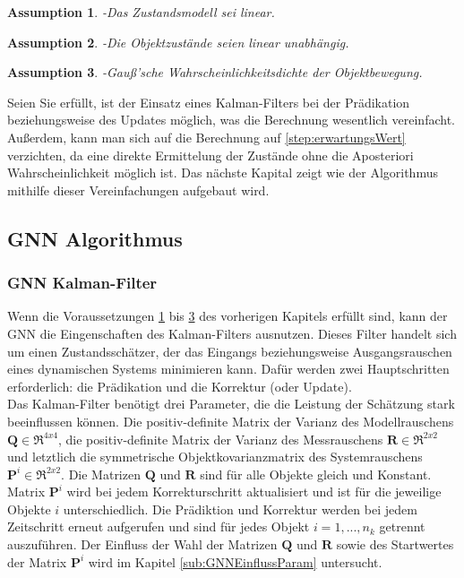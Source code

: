\documentclass[10pt,a4paper]{article}
\newtheorem{assumption}{Assumption}
\begin{document}
\begin{assumption}-\label{Ass:LinMod}
  Das Zustandsmodell sei linear.
\end{assumption}
\begin{assumption}-\label{Ass:ZustUnab}
  Die Objektzustände seien linear unabhängig.
\end{assumption}
\begin{assumption}-\label{AssGauss}
  Gauß'sche Wahrscheinlichkeitsdichte der Objektbewegung.
\end{assumption}
Seien Sie erfüllt, ist der Einsatz eines Kalman-Filters bei der Prädikation beziehungsweise des Updates möglich, was die Berechnung wesentlich vereinfacht. Außerdem, kann man sich auf die Berechnung auf \ref{step:erwartungsWert} verzichten, da eine direkte Ermittelung der Zustände ohne die Aposteriori Wahrscheinlichkeit möglich ist. Das nächste Kapital zeigt wie der Algorithmus mithilfe dieser Vereinfachungen aufgebaut wird.
\subsection{GNN Algorithmus}\label{subsec:GNNAlg}
\subsubsection{GNN Kalman-Filter}
Wenn die Voraussetzungen \ref{Ass:LinMod} bis \ref{AssGauss} des vorherigen Kapitels erfüllt sind, kann der GNN die Eingenschaften des Kalman-Filters ausnutzen. Dieses Filter handelt sich um einen Zustandsschätzer, der das Eingangs beziehungsweise Ausgangsrauschen eines dynamischen Systems minimieren kann. Dafür werden zwei Hauptschritten erforderlich: die Prädikation und die Korrektur (oder Update).\\
Das Kalman-Filter benötigt drei Parameter, die die Leistung der Schätzung stark beeinflussen können. Die positiv-definite Matrix der Varianz des Modellrauschens $\textbf{Q} \in \Re^{4x4}$, die positiv-definite Matrix der Varianz des Messrauschens $\textbf{R} \in \Re^{2x2}$ und letztlich die symmetrische  Objektkovarianzmatrix des Systemrauschens $\textbf{P}^i \in \Re^{2x2}$. Die Matrizen $\textbf{Q}$ und $\textbf{R}$ sind für alle Objekte gleich und Konstant. Matrix $\textbf{P}^i$ wird bei jedem Korrekturschritt aktualisiert und ist für die jeweilige Objekte $i$ unterschiedlich. Die Prädiktion und Korrektur werden bei jedem Zeitschritt erneut aufgerufen und sind für jedes Objekt $i = 1,...,n_k$ getrennt auszuführen. Der Einfluss der Wahl der Matrizen $\textbf{Q}$ und $\textbf{R}$ sowie des Startwertes der Matrix $\textbf{P}^i$ wird im Kapitel \ref{sub:GNNEinflussParam} untersucht.
\end{document}
